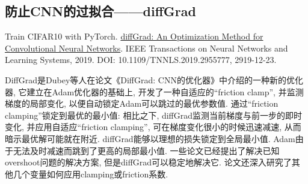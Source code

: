 \subsection{防止CNN的过拟合——diffGrad}
Train CIFAR10 with PyTorch. \href{https://ieeexplore.ieee.org/document/8939562}{diffGrad: An Optimization Method for Convolutional Neural Networks}. IEEE Transactions on Neural Networks and Learning Systems, 2019.
DOI: 10.1109/TNNLS.2019.2955777, 2919-12-23.

DiffGrad是Dubey等人在论文《DiffGrad: CNN的优化器》中介绍的一种新的优化器, 它建立在Adam优化器的基础上, 开发了一种自适应的“friction clamp”, 并监测梯度的局部变化, 以便自动锁定Adam可以跳过的最优参数值.
通过“friction clamping”锁定到最优的最小值: 相比之下, diffGrad监测当前梯度与前一步的即时变化, 并应用自适应“friction clamping”, 可在梯度变化很小的时候迅速减速, 从而暗示最优解可能就在附近.
diffGrad能够以理想的损失锁定到全局最小值. Adam由于无法及时减速而跳到了更高的局部最小值.
一些论文已经提出了解决已知overshoot问题的解决方案, 但是diffGrad可以稳定地解决它.
论文还深入研究了其他几个变量如何应用clamping或friction系数.

